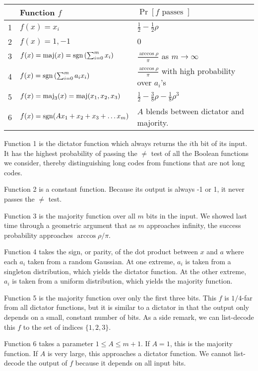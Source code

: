 \documentclass[12pt]{article}
\begin{document}
\begin{tabular}{|l|l|l|}
\hline
& \textbf{Function $f$} & \textbf{$\Pr\left[f \textrm{ passes }\right]$}\\
\hline
1 & $f(x) = x_i$ & $\frac{1}{2} - \frac{1}{2}\rho$\\
\hline
2 & $f(x) = 1,-1$ & $0$\\
\hline
3 & $f(x) = \mathop{\rm {maj}}(x) = \mathop{\rm {sgn}}\left(\sum_{i=0}^m{x_i}\right)$ &
$\frac{\arccos{\rho}}{\pi}$ as $m \rightarrow \infty$\\
\hline
4 & $f(x) = \mathop{\rm {sgn}}\left(\sum_{i=0}^m{a_i x_i}\right)$ &
$\frac{\arccos{\rho}}{\pi}$ with high probability over $a_i$'s\\
\hline
5 & $f(x) = \textrm{maj}_3(x) = \mathop{\rm {maj}}(x_1,x_2,x_3)$ & $\frac{1}{2} - \frac{3}{8}\rho - \frac{1}{8}\rho^3$\\
\hline
6 & $f(x) = \mathop{\rm {sgn}}(Ax_1 + x_2 + x_3 + \ldots x_m)$ & $A$ blends between dictator and majority. \\
\hline
\end{tabular}

\vspace{\baselineskip}

Function 1 is the dictator function which always returns the $i$th bit of
its input. It has the highest probability of passing the $\ne$ test of
all the Boolean functions we consider, thereby distinguishing long codes
from functions that are not long codes.

Function 2 is a constant function. Because its output is always -1 or 1,
it never passes the $\ne$ test.

Function 3 is the majority function over all $m$ bits in the input. We showed
last time through a geometric argument that as $m$ approaches infinity,
the success probability approaches $\arccos{\rho}/\pi$.

Function 4 takes the sign, or parity, of the dot product between $x$ and $a$
where each $a_i$ taken from a random Gaussian. At one extreme,
$a_i$ is taken from a singleton distribution, which yields the dictator
function. At the other extreme, $a_i$ is taken from a uniform distribution,
which yields the majority function.

Function 5 is the majority function over only the first three bits.
This $f$ is $1/4$-far from all dictator functions, but it is similar to
a dictator in that the output only depends on a small, constant number of
bits. As a side remark, we can list-decode this $f$ to the set of indices
$\{1,2,3\}$.

Function 6 takes a parameter $1 \le A \le m+1$. If $A=1$, this is the
majority function. If $A$ is very large, this approaches a dictator
function. We cannot list-decode the output of $f$ because it depends
on all input bits.
\end{document}
